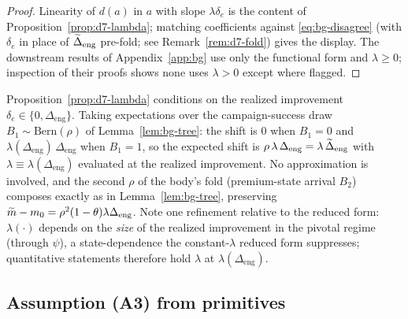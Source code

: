 \begin{proof}
Linearity of $d(a)$ in $a$ with slope $\lambda\delta_{e}$ is the content of Proposition~\ref{prop:d7-lambda}; matching coefficients against \eqref{eq:bg-disagree} (with $\delta_{e}$ in place of $\widetilde{\Delta}_{\mathrm{eng}}$ pre-fold; see Remark~\ref{rem:d7-fold}) gives the display. The downstream results of Appendix~\ref{app:bg} use only the functional form and $\lambda\ge0$; inspection of their proofs shows none uses $\lambda>0$ except where flagged.
\end{proof}

\begin{remark}
\label{rem:d7-fold}
Proposition~\ref{prop:d7-lambda} conditions on the realized improvement $\delta_{e}\in\{0,\Delta_{\mathrm{eng}}\}$. Taking expectations over the campaign-success draw $B_{1}\sim\mathrm{Bern}(\rho)$ of Lemma~\ref{lem:bg-tree}: the shift is $0$ when $B_{1}=0$ and $\lambda(\Delta_{\mathrm{eng}})\,\Delta_{\mathrm{eng}}$ when $B_{1}=1$, so the expected shift is $\rho\,\lambda\,\Delta_{\mathrm{eng}}=\lambda\,\widetilde{\Delta}_{\mathrm{eng}}$ with $\lambda\equiv\lambda(\Delta_{\mathrm{eng}})$ evaluated at the realized improvement. No approximation is involved, and the second $\rho$ of the body's fold (premium-state arrival $B_{2}$) composes exactly as in Lemma~\ref{lem:bg-tree}, preserving $\widetilde{m}-m_{0}=\rho^{2}(1-\theta)\lambda\Delta_{\mathrm{eng}}$. Note one refinement relative to the reduced form: $\lambda(\cdot)$ depends on the \emph{size} of the realized improvement in the pivotal regime (through $\psi$), a state-dependence the constant-$\lambda$ reduced form suppresses; quantitative statements therefore hold $\lambda$ at $\lambda(\Delta_{\mathrm{eng}})$.
\end{remark}

\subsection{Assumption (A3) from primitives}

